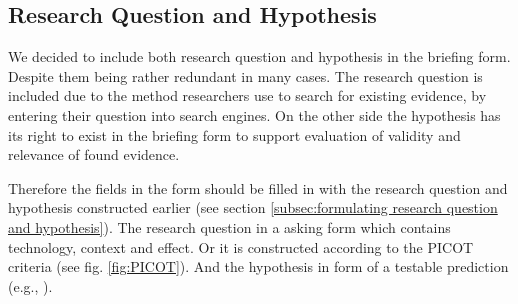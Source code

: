 \subsection{Research Question and Hypothesis}
\label{subsec:research question and hypothesis}

We decided to include both research question and hypothesis in the briefing form. Despite them being rather redundant in many cases. The research question is included due to the method researchers use to search for existing evidence, by entering their question into search engines. On the other side the hypothesis has its right to exist in the briefing form to support evaluation of validity and relevance of found evidence. 

Therefore the fields in the form should be filled in with the research question and hypothesis constructed earlier (see section \ref{subsec:formulating research question and hypothesis}). The research question in a asking form which contains technology, context and effect. Or it is constructed according to the PICOT criteria (see fig. \ref{fig:PICOT}). And the hypothesis in form of a testable prediction (e.g.,  \cite{Buddies2010}).